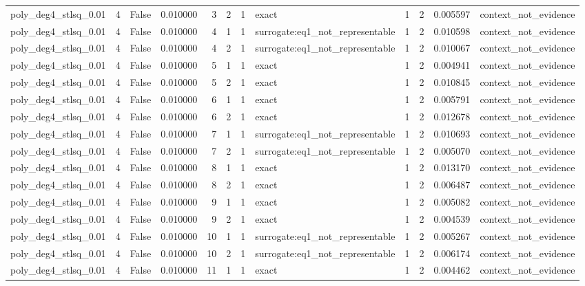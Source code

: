 \begin{tabular}{lrrrrrrlrrrl}
poly\_deg4\_stlsq\_0.01 & 4 & False & 0.010000 & 3 & 2 & 1 & exact & 1 & 2 & 0.005597 & context\_not\_evidence \\
poly\_deg4\_stlsq\_0.01 & 4 & False & 0.010000 & 4 & 1 & 1 & surrogate:eq1\_not\_representable & 1 & 2 & 0.010598 & context\_not\_evidence \\
poly\_deg4\_stlsq\_0.01 & 4 & False & 0.010000 & 4 & 2 & 1 & surrogate:eq1\_not\_representable & 1 & 2 & 0.010067 & context\_not\_evidence \\
poly\_deg4\_stlsq\_0.01 & 4 & False & 0.010000 & 5 & 1 & 1 & exact & 1 & 2 & 0.004941 & context\_not\_evidence \\
poly\_deg4\_stlsq\_0.01 & 4 & False & 0.010000 & 5 & 2 & 1 & exact & 1 & 2 & 0.010845 & context\_not\_evidence \\
poly\_deg4\_stlsq\_0.01 & 4 & False & 0.010000 & 6 & 1 & 1 & exact & 1 & 2 & 0.005791 & context\_not\_evidence \\
poly\_deg4\_stlsq\_0.01 & 4 & False & 0.010000 & 6 & 2 & 1 & exact & 1 & 2 & 0.012678 & context\_not\_evidence \\
poly\_deg4\_stlsq\_0.01 & 4 & False & 0.010000 & 7 & 1 & 1 & surrogate:eq1\_not\_representable & 1 & 2 & 0.010693 & context\_not\_evidence \\
poly\_deg4\_stlsq\_0.01 & 4 & False & 0.010000 & 7 & 2 & 1 & surrogate:eq1\_not\_representable & 1 & 2 & 0.005070 & context\_not\_evidence \\
poly\_deg4\_stlsq\_0.01 & 4 & False & 0.010000 & 8 & 1 & 1 & exact & 1 & 2 & 0.013170 & context\_not\_evidence \\
poly\_deg4\_stlsq\_0.01 & 4 & False & 0.010000 & 8 & 2 & 1 & exact & 1 & 2 & 0.006487 & context\_not\_evidence \\
poly\_deg4\_stlsq\_0.01 & 4 & False & 0.010000 & 9 & 1 & 1 & exact & 1 & 2 & 0.005082 & context\_not\_evidence \\
poly\_deg4\_stlsq\_0.01 & 4 & False & 0.010000 & 9 & 2 & 1 & exact & 1 & 2 & 0.004539 & context\_not\_evidence \\
poly\_deg4\_stlsq\_0.01 & 4 & False & 0.010000 & 10 & 1 & 1 & surrogate:eq1\_not\_representable & 1 & 2 & 0.005267 & context\_not\_evidence \\
poly\_deg4\_stlsq\_0.01 & 4 & False & 0.010000 & 10 & 2 & 1 & surrogate:eq1\_not\_representable & 1 & 2 & 0.006174 & context\_not\_evidence \\
poly\_deg4\_stlsq\_0.01 & 4 & False & 0.010000 & 11 & 1 & 1 & exact & 1 & 2 & 0.004462 & context\_not\_evidence \\

\end{tabular}
